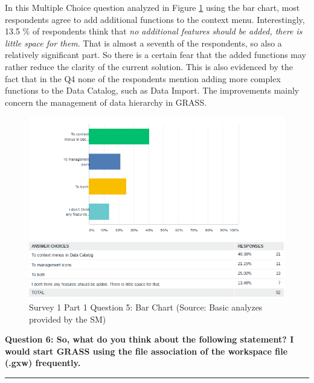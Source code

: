 \documentclass[a4paper,10pt,twoside]{article}
\begin{document}
\noindent In this Multiple Choice question analyzed in Figure
\ref{fig:survey1_part1_question5_descriptive_stats_sm} using the bar
chart, most respondents agree to add additional functions to the
context menu. Interestingly, 13.5 \% of respondents think that
\textit{no additional features should be added, there is little space
  for them}. That is almost a seventh of the respondents, so also a
relatively significant part. So there is a certain fear that the added
functions may rather reduce the clarity of the current solution. This
is also evidenced by the fact that in the Q4 none of the respondents
mention adding more complex functions to the Data Catalog, such as
Data Import. The improvements mainly concern the management of data
hierarchy in GRASS.

\vspace{0.3cm}
\begin{figure}[hbt!] 
\begin{center}
\includegraphics[width=17cm]{../surveys/analyzed_data/survey1_part1_question5_descriptive_stats_sm.png} 
\caption[Survey 1 Part 1 Question 5: Bar Chart]{Survey 1 Part 1 Question 5: Bar Chart (Source: Basic analyzes provided by the SM)}
\label{fig:survey1_part1_question5_descriptive_stats_sm}
\end{center}
\end{figure}

\newpage
\noindent \textbf{Question 6: So, what do you think about the following statement? I would start GRASS using the file association of the workspace file (.gxw) frequently.}
\par\noindent\rule{\textwidth}{0.4pt}
\end{document}

